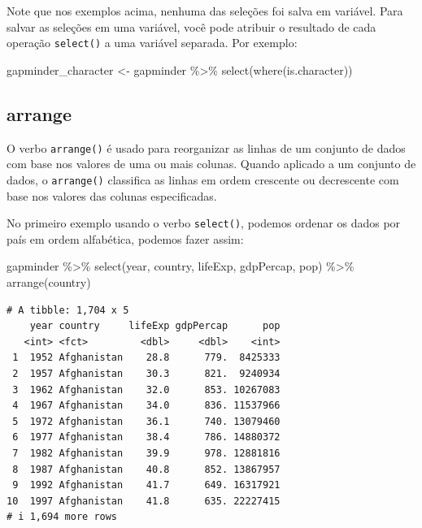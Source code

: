 \documentclass[
  portuguese,
  letterpaper,
  DIV=11,
  numbers=noendperiod]{scrreprt}
\newenvironment{Shaded}{\begin{snugshade}}{\end{snugshade}}
\newcommand{\FunctionTok}[1]{\textcolor[rgb]{0.28,0.35,0.67}{#1}}
\newcommand{\NormalTok}[1]{\textcolor[rgb]{0.00,0.23,0.31}{#1}}
\newcommand{\OtherTok}[1]{\textcolor[rgb]{0.00,0.23,0.31}{#1}}
\newcommand{\SpecialCharTok}[1]{\textcolor[rgb]{0.37,0.37,0.37}{#1}}
\theoremstyle{definition}
\theoremstyle{remark}
\begin{document}
Note que nos exemplos acima, nenhuma das seleções foi salva em variável.
Para salvar as seleções em uma variável, você pode atribuir o resultado
de cada operação \texttt{select()} a uma variável separada. Por exemplo:

\begin{Shaded}
\begin{Highlighting}[]
\NormalTok{gapminder\_character }\OtherTok{\textless{}{-}}\NormalTok{ gapminder }\SpecialCharTok{\%\textgreater{}\%} 
  \FunctionTok{select}\NormalTok{(}\FunctionTok{where}\NormalTok{(is.character))}
\end{Highlighting}
\end{Shaded}

\subsection{arrange}\label{arrange}

O verbo \texttt{arrange()} é usado para reorganizar as linhas de um
conjunto de dados com base nos valores de uma ou mais colunas. Quando
aplicado a um conjunto de dados, o \texttt{arrange()} classifica as
linhas em ordem crescente ou decrescente com base nos valores das
colunas especificadas.

No primeiro exemplo usando o verbo \texttt{select()}, podemos ordenar os
dados por país em ordem alfabética, podemos fazer assim:

\begin{Shaded}
\begin{Highlighting}[]
\NormalTok{gapminder }\SpecialCharTok{\%\textgreater{}\%}
  \FunctionTok{select}\NormalTok{(year, country, lifeExp, gdpPercap, pop) }\SpecialCharTok{\%\textgreater{}\%}
  \FunctionTok{arrange}\NormalTok{(country)}
\end{Highlighting}
\end{Shaded}

\begin{verbatim}
# A tibble: 1,704 x 5
    year country     lifeExp gdpPercap      pop
   <int> <fct>         <dbl>     <dbl>    <int>
 1  1952 Afghanistan    28.8      779.  8425333
 2  1957 Afghanistan    30.3      821.  9240934
 3  1962 Afghanistan    32.0      853. 10267083
 4  1967 Afghanistan    34.0      836. 11537966
 5  1972 Afghanistan    36.1      740. 13079460
 6  1977 Afghanistan    38.4      786. 14880372
 7  1982 Afghanistan    39.9      978. 12881816
 8  1987 Afghanistan    40.8      852. 13867957
 9  1992 Afghanistan    41.7      649. 16317921
10  1997 Afghanistan    41.8      635. 22227415
# i 1,694 more rows
\end{verbatim}
\end{document}
